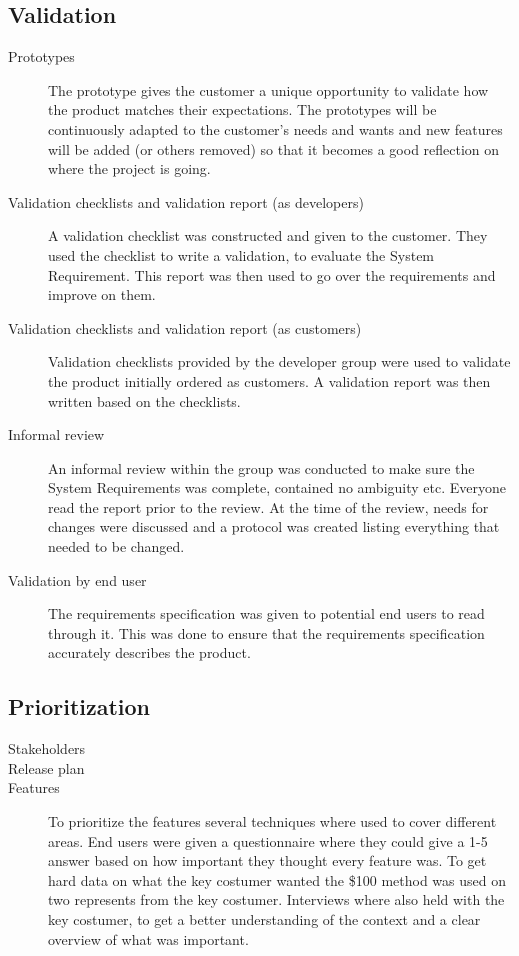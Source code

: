 \documentclass[10pt,a4paper]{article}
\begin{document}
\subsection{Validation}
\begin{description}
\item[Prototypes] The prototype gives the customer a unique opportunity to validate how the product matches their expectations. The prototypes will be continuously adapted to the customer's needs and wants and new features will be added (or others removed) so that it becomes a good reflection on where the project is going. 

\item[Validation checklists and validation report (as developers)] A validation checklist was constructed and given to the customer. They used the checklist to write a validation, to evaluate the System Requirement. This report was then used to go over the requirements and improve on them.

\item[Validation checklists and validation report (as customers)] Validation checklists provided by the developer group were used to validate the product initially ordered as customers. A validation report was then written based on the checklists.

\item[Informal review] An informal review within the group was conducted to make sure the System Requirements was complete, contained no ambiguity etc. Everyone read the report prior to the review. At the time of the review, needs for changes were discussed and a protocol was created listing everything that needed to be changed.

\item[Validation by end user] The requirements specification was given to potential end users to read through it. This was done to ensure that the requirements specification accurately describes the product.

\end{description}


\subsection{Prioritization}
\begin{description}
\item[Stakeholders] 

\item[Release plan]

\item[Features] To prioritize the features several techniques where used to cover different areas. End users were given a questionnaire where they could give a 1-5 answer based on how important they thought every feature was. To get hard data on what the key costumer wanted the \$100 method was used on two represents from the key costumer. Interviews where also held with the key costumer, to get a better understanding of the context and a clear overview of what was important.
\end{description}
\end{document}
